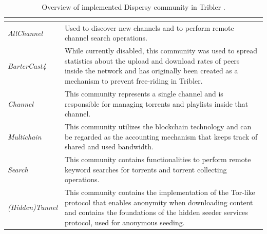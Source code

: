 \begin{table}[tbp]
	\centering
	\caption{Overview of implemented Dispersy community in Tribler \cite{2016:tribler-techdebt:vos}.}
	\label{tbl:community}
	\begin{tabular}{|l|p{11cm}|}
		\hline
		\rowcolor[HTML]{EFEFEF} 
		\multicolumn{1}{|c|}{\cellcolor[HTML]{EFEFEF}{\color[HTML]{333333} \textbf{Community Name}}} & \multicolumn{1}{c|}{\cellcolor[HTML]{EFEFEF}{\color[HTML]{333333} \textbf{Purpose}}}                                                                                                                                     \\ \hline
		\textit{AllChannel}                                                                          & Used to discover new channels and to perform remote channel search operations.                                                                                                                                           \\ \hline
		\textit{BarterCast4}                                                                         & While currently disabled, this community was used to spread statistics about the upload and download rates of peers inside the network and has originally been created as a mechanism to prevent free-riding in Tribler. \\ \hline
		\textit{Channel}                                                                             & This community represents a single channel and is responsible for managing torrents and playlists inside that channel.                                                                                                   \\ \hline
		\textit{Multichain}                                                                          & This community utilizes the blockchain technology and can be regarded as the accounting mechanism that keeps track of shared and used bandwidth.                                                                         \\ \hline
		\textit{Search}                                                                              & This community contains functionalities to perform remote keyword searches for torrents and torrent collecting operations.                                                                                               \\ \hline
		\textit{(Hidden)Tunnel}                                                                      & This community contains the implementation of the Tor-like protocol that enables anonymity when downloading content and contains the foundations of the hidden seeder services protocol, used for anonymous seeding.     \\ \hline
	\end{tabular}
\end{table}

